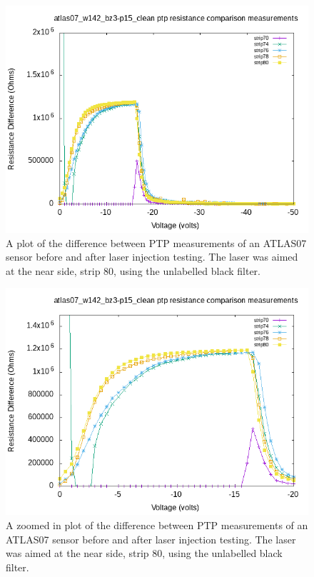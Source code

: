 \documentclass{report}
\begin{document}
            \begin{figure}[h] 
                \includegraphics[height=.4\textheight]{atlas07_w142_bz3-p15_clean_resistance_comparison_plots_base}
                \centering
                \caption{ A plot of the difference between PTP measurements of an ATLAS07 sensor before and after laser injection testing. The laser was aimed at the near side, strip 80, using the unlabelled black filter. }
                \label{fig:atlas07_w142_bz3-p15_clean_resistance_comparison_plots_base}
            \end{figure}

            \begin{figure}[h] 
                \includegraphics[height=.4\textheight]{atlas07_w142_bz3-p15_clean_resistance_comparison_plots_zoom}
                \centering
                \caption{ A zoomed in plot of the difference between PTP measurements of an ATLAS07 sensor before and after laser injection testing. The laser was aimed at the near side, strip 80, using the unlabelled black filter. }
                \label{fig:atlas07_w142_bz3-p15_clean_resistance_comparison_plots_zoom}
            \end{figure}
            
\end{document}
